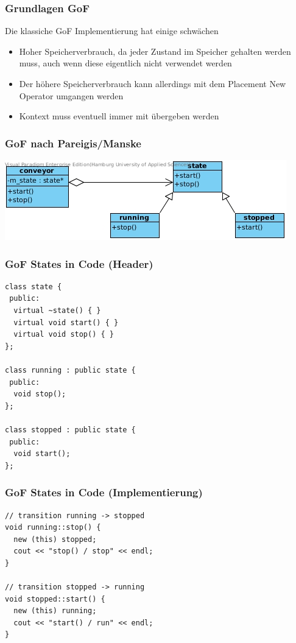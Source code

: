 \documentclass{beamer}
\begin{document}
\begin{frame}
 \frametitle{Grundlagen GoF}
 Die klassiche GoF Implementierung hat einige schw\"achen
 \begin{itemize}
  \item Hoher Speicherverbrauch, da jeder Zustand im Speicher gehalten werden muss, auch wenn diese eigentlich nicht verwendet werden
  \item Der h\"ohere Speicherverbrauch kann allerdings mit dem Placement New Operator umgangen werden
  \item Kontext muss eventuell immer mit \"ubergeben werden
 \end{itemize}
\end{frame}

\begin{frame}
 \frametitle{GoF nach Pareigis/Manske}
 \includegraphics[scale=.6]{img/fsm_gof.jpg}
\end{frame}

\begin{frame}[fragile]
 \frametitle{GoF States in Code (Header)}
 \begin{lstlisting}
class state {
 public:
  virtual ~state() { }
  virtual void start() { }
  virtual void stop() { }
};

class running : public state {
 public:
  void stop();
};

class stopped : public state {
 public:
  void start();
};
 \end{lstlisting}
\end{frame}

\begin{frame}[fragile]
 \frametitle{GoF States in Code (Implementierung)}
 \begin{lstlisting}
// transition running -> stopped
void running::stop() {
  new (this) stopped;
  cout << "stop() / stop" << endl;
}

// transition stopped -> running
void stopped::start() {
  new (this) running;
  cout << "start() / run" << endl;
}
 \end{lstlisting}
\end{frame}
\end{document}
